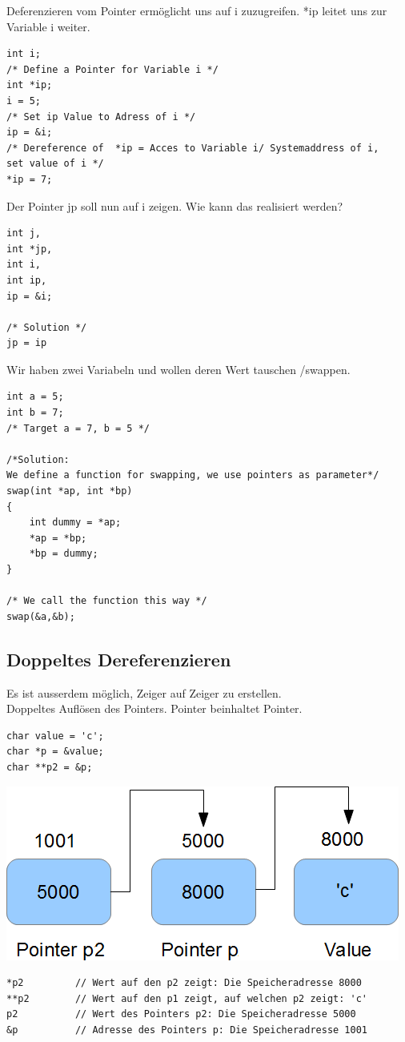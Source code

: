 \documentclass[a4paper,10pt]{report}
\begin{document}
Deferenzieren vom Pointer ermöglicht uns auf i zuzugreifen. *ip leitet uns zur Variable  i weiter.
\begin{lstlisting}[frame=single] 
int i;
/* Define a Pointer for Variable i */
int *ip;
i = 5;
/* Set ip Value to Adress of i */
ip = &i;
/* Dereference of  *ip = Acces to Variable i/ Systemaddress of i, 
set value of i */
*ip = 7;
\end{lstlisting}
\bigskip
Der Pointer jp soll nun auf i zeigen. Wie kann das realisiert werden?
\begin{lstlisting}[frame=single] 
int j,
int *jp,
int i,
int ip,
ip = &i;

/* Solution */
jp = ip
\end{lstlisting}
Wir haben zwei Variabeln und wollen deren Wert tauschen /swappen.
\begin{lstlisting}[frame=single] 
int a = 5;
int b = 7;
/* Target a = 7, b = 5 */

/*Solution:
We define a function for swapping, we use pointers as parameter*/
swap(int *ap, int *bp)
{
	int dummy = *ap;
	*ap = *bp;
	*bp = dummy;
}

/* We call the function this way */
swap(&a,&b);
\end{lstlisting}
\newpage

\subsection{Doppeltes Dereferenzieren}
Es ist ausserdem möglich, Zeiger auf Zeiger zu erstellen.\\
Doppeltes Auflösen des Pointers. Pointer beinhaltet Pointer.\\
\begin{lstlisting}[]
char value = 'c';
char *p = &value;
char **p2 = &p;
\end{lstlisting}
\begin{center}\includegraphics[scale=0.6]{imgs/c-pointers2.png}\end{center}
\begin{lstlisting}[]
*p2 		// Wert auf den p2 zeigt: Die Speicheradresse 8000
**p2 		// Wert auf den p1 zeigt, auf welchen p2 zeigt: 'c'
p2 			// Wert des Pointers p2: Die Speicheradresse 5000
&p 			// Adresse des Pointers p: Die Speicheradresse 1001
\end{lstlisting}
\end{document}

